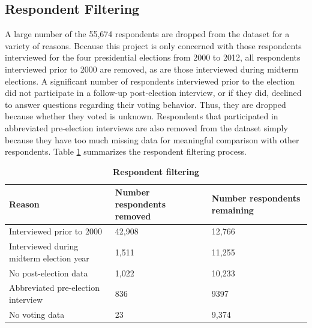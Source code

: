 \documentclass{article}
\begin{document}
	\subsection{Respondent Filtering}
	
	A large number of the 55,674 respondents are dropped from the dataset for a variety of reasons. Because this project is only concerned with those respondents interviewed for the four presidential elections from 2000 to 2012, all respondents interviewed prior to 2000 are removed, as are those interviewed during midterm elections. A significant number of respondents interviewed prior to the election did not participate in a follow-up post-election interview, or if they did, declined to answer questions regarding their voting behavior. Thus, they are dropped because whether they voted is unknown. Respondents that participated in abbreviated pre-election interviews are also removed from the dataset simply because they have too much missing data for meaningful comparison with other respondents. Table \ref{table:respondent_filtering} summarizes the respondent filtering process.
		\begin{table}[h!]
			\begin{center}
				\begin{tabular}{ |m{4.5cm}|m{2cm}|m{2cm}| } 
					\hline
					Reason & Number respondents removed & Number respondents remaining  \\ 
					\hline
					Interviewed prior to 2000 & 42,908 & 12,766 \\ 
					\hline
					Interviewed during midterm election year & 1,511 & 11,255 \\ 
					\hline
					No post-election data & 1,022 & 10,233 \\
					\hline
					Abbreviated pre-election interview & 836 & 9397 \\
					\hline
					No voting data & 23 & 9,374 \\
					\hline		
				\end{tabular}
			\caption{\textbf{Respondent filtering}}
			\label{table:respondent_filtering}
			\end{center}
		\end{table}
	
\end{document}

